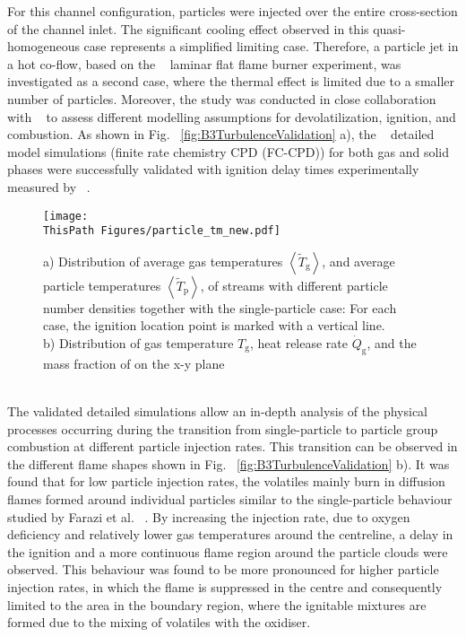 \begin{btUnit}
For this channel configuration, particles were injected over the entire cross-section of the channel inlet. The significant cooling effect observed in this quasi-homogeneous case represents a simplified limiting case. Therefore, a particle jet in a hot co-flow, based on the ~ laminar flat flame burner experiment, was investigated as a second case, where the thermal effect is limited due to a smaller number of particles. Moreover, the study was conducted in close collaboration with ~ to assess different modelling assumptions for devolatilization, ignition, and combustion. As shown in Fig. ~\ref{fig:B3TurbulenceValidation} a), the ~ detailed model simulations (finite rate chemistry CPD (FC-CPD)) for both gas and solid phases were successfully validated with ignition delay times experimentally measured by ~.
\begin{figure}
	\texttt{[image: \\ThisPath Figures/particle\_tm\_new.pdf]}
	\caption{a) Distribution of average gas temperatures $\left\langle\tilde{T}_{\mathrm{g}}\right\rangle$, and average particle temperatures $\left\langle\tilde{T}_{\mathrm{p}}\right\rangle$, of streams with different particle number densities together with the single-particle case: For each case, the ignition location point is marked with a vertical line.\\b) Distribution of gas temperature $T_\mathrm{g}$, heat release rate $\dot{Q}_\mathrm{g}$, and the mass fraction of  on the x-y plane}\label{fig:B3GroupParticle}
\end{figure}
\\
The validated detailed simulations allow an in-depth analysis of the physical processes occurring during the transition from single-particle to particle group combustion at different particle injection rates. This transition can be observed in the different flame shapes shown in Fig. ~\ref{fig:B3TurbulenceValidation} b). It was found that for low particle injection rates, the volatiles mainly burn in diffusion flames formed around individual particles similar to the single-particle behaviour studied by Farazi et al. ~\cite{Farazi2019a}. By increasing the injection rate, due to oxygen deficiency and relatively lower gas temperatures around the centreline, a delay in the ignition and a more continuous flame region around the particle clouds were observed. This behaviour was found to be more pronounced for higher particle injection rates, in which the flame is suppressed in the centre and consequently limited to the area in the boundary region, where the ignitable mixtures are formed due to the mixing of volatiles with the oxidiser.

\end{btUnit}
